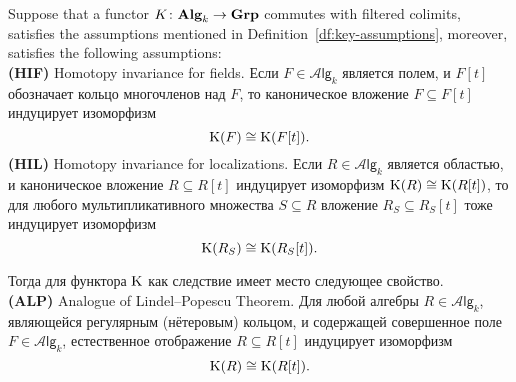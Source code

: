 \documentclass[oneside, 11pt]{amsart} \pdfoutput=1
\begin{document}
\begin{theorem}
\label{lpb}
Suppose that a functor $K \colon {\normalfont\textbf{Alg}}_k \to {\normalfont\textbf{Grp}}$ commutes with filtered colimits, satisfies the assumptions mentioned in Definition~\ref{df:key-assumptions}, moreover, satisfies the following assumptions:\\
{\rm\bf (HIF)} Homotopy invariance for fields. Если $F\in\mathcal A\mathsf{lg}_k$ является полем, и $F[t]$ обозначает кольцо многочленов над $F$, то каноническое вложение $F\subseteq F[t]$ индуцирует изоморфизм
$$
{\mathrm{K}}(F)\cong{\mathrm{K}}(F[t]).
$$
{\rm\bf (HIL)} Homotopy invariance for localizations. Если $R\in\mathcal A\mathsf{lg}_k$ является областью, и каноническое вложение $R\subseteq R[t]$ индуцирует изоморфизм ${\mathrm{K}}(R)\cong{\mathrm{K}}(R[t])$, то для любого мультипликативного множества $S\subseteq R$ вложение $R_S\subseteq R_S[t]$ тоже индуцирует изоморфизм
$$
{\mathrm{K}}(R_S)\cong{\mathrm{K}}(R_S[t]).
$$

Тогда для функтора ${\mathrm{K}}$ как следствие имеет место следующее свойство.\\
{\bf(ALP)} Analogue of Lindel--Popescu Theorem. Для любой алгебры $R\in\mathcal A\mathsf{lg}_k$, являющейся регулярным {\rm(}нётеровым{\rm)} кольцом, и содержащей совершенное поле $F\in\mathcal A\mathsf{lg}_k$, естественное отображение $R\subseteq R[t]$ индуцирует изоморфизм
$$
{\mathrm{K}}(R)\cong{\mathrm{K}}(R[t]).
$$
\end{theorem}
\end{document}
